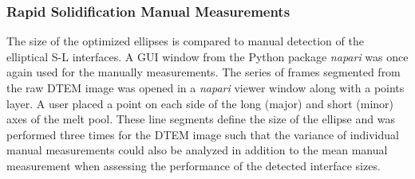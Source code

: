 \subsubsection{Rapid Solidification Manual Measurements}
The size of the
optimized ellipses is compared to manual detection of the elliptical
S-L interfaces. A GUI window from the Python package \textit{napari}
was once again used for the manually measurements.
The series of frames segmented from the raw DTEM image was opened in a
\textit{napari} viewer window along with a points layer. A user placed a point
on each side of the long (major) and short (minor) axes of the melt pool.
These line segments define the size of the ellipse and was performed three
times for the DTEM image such that the variance of individual manual
measurements could also be analyzed in addition to the mean
manual measurement when assessing the performance of the detected
interface sizes.

